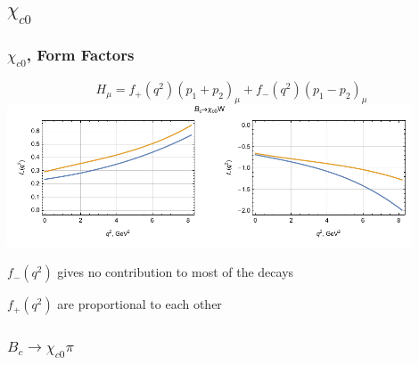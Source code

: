 \documentclass{beamer}
\begin{document}
\subsection{$\chi_{c0}$}
\begin{frame}
  \frametitle{$\chi_{c0}$, Form Factors}
  $$
  H_\mu = f_{+}\left(q^2\right) \left(p_1+p_2\right)_\mu + f_{-}\left(q^2\right) \left(p_1-p_2\right)_\mu 
  $$
  \includegraphics[width=0.9\textwidth]{figs/ff_chi_c0}

  $f_{-}(q^2)$ gives no contribution to most of the decays
  
  $f_{+}(q^2)$ are proportional to each other
\end{frame}

\newcommand{\Br}{\mathrm{Br}}

\begin{frame}
  \frametitle{$B_c \to \chi_{c0} \pi$}
  \begin{columns}
    \begin{column}{0.5\textwidth}
      \centering{[Ebert]:}
      
    \end{column}
    \begin{column}{0.5\textwidth}
      \centering{[Wang]:}
      
    \end{column}
  \end{columns}
\end{frame}
\end{document}
